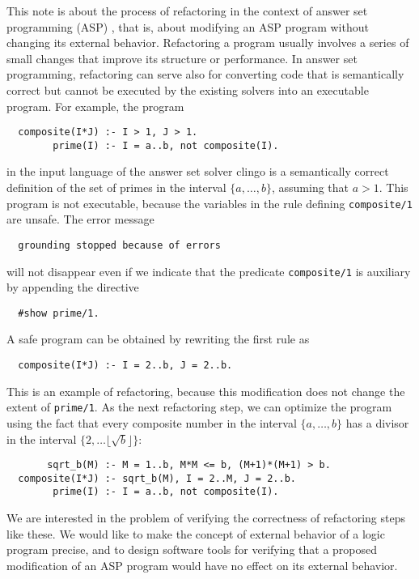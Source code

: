 \documentclass{article}
\begin{document}
This note is about the process of refactoring in the context of answer set
programming (ASP) \cite{mar99,nie99}, %
that is, about modifying an ASP program without changing
its external behavior.  Refactoring a program usually involves a series of
small changes that improve its structure or performance.  In answer set
programming, refactoring can serve also for converting code that is
semantically correct but cannot be executed by the existing solvers into an
executable program.  For example, the program
\begin{verbatim}
  composite(I*J) :- I > 1, J > 1.
        prime(I) :- I = a..b, not composite(I).
\end{verbatim}
in the input language of the answer set solver {\sc clingo} \cite{geb12}
is a semantically correct definition of the set of primes in the
interval $\{a,\dots,b\}$, assuming that $a>1$.  This program
is not executable, because the variables in
the rule defining \verb|composite/1| are unsafe.  The error message
\begin{verbatim}
  grounding stopped because of errors
\end{verbatim}
will not disappear even if we indicate that the predicate
\verb|composite/1| is auxiliary by appending the directive
\begin{verbatim}
  #show prime/1.
\end{verbatim}
A safe program can be obtained by rewriting the first rule as
\begin{verbatim}
  composite(I*J) :- I = 2..b, J = 2..b.
\end{verbatim}
This is an example of refactoring, because this modification
does not change the extent of \verb|prime/1|.
As the next refactoring step, we can optimize the program using the
fact that every composite
number in the interval $\{a,\dots,b\}$ has a divisor in the interval
$\{2,\dots\lfloor \sqrt b\rfloor\}$:
\begin{verbatim}
       sqrt_b(M) :- M = 1..b, M*M <= b, (M+1)*(M+1) > b.
  composite(I*J) :- sqrt_b(M), I = 2..M, J = 2..b.
        prime(I) :- I = a..b, not composite(I).
\end{verbatim}

We are interested in the problem of verifying the correctness of
refactoring steps like these. We would like to make the concept of external
behavior of a logic program precise, and to
design software tools for verifying that a proposed modification of an
ASP program would have no effect on its external behavior.
\end{document}
